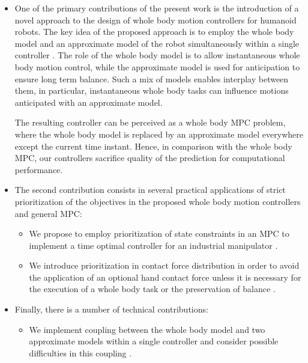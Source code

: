 \begin{itemize}
    \item One of the primary contributions of the present work is the
        introduction of a novel approach to the design of whole body motion
        controllers for humanoid robots. The key idea of the proposed approach
        is to employ the whole body model and an approximate model of the robot
        simultaneously within a single controller \cite{Sherikov2014humanoids,
        Sherikov2015humanoids}. The role of the whole body model is to allow
        instantaneous whole body motion control, while the approximate model is
        used for anticipation to ensure long term balance. Such a mix of models
        enables interplay between them, in particular, instantaneous whole body
        tasks can influence motions anticipated with an approximate model.

        The resulting controller can be perceived as a whole body \ac{MPC}
        problem, where the whole body model is replaced by an approximate model
        everywhere except the current time instant. Hence, in comparison with
        the whole body \ac{MPC}, our controllers sacrifice quality of the
        prediction for computational performance.


    \item The second contribution consists in several practical applications of
        strict prioritization of the objectives in the proposed whole body
        motion controllers and general \ac{MPC}:
        \begin{itemize}
            \item We propose to employ prioritization of state constraints in
                an \ac{MPC} to implement a time optimal controller for an
                industrial manipulator \cite{alHomsi2016icra}.

            \item We introduce prioritization in contact force distribution in
                order to avoid the application of an optional hand contact
                force unless it is necessary for the execution of a whole body
                task or the preservation of balance
                \cite{Sherikov2015humanoids}.
        \end{itemize}


    \item Finally, there is a number of technical contributions:
        \begin{itemize}
            \item We implement coupling between the whole body model and two
                approximate models within a single controller and consider
                possible difficulties in this coupling
                \cite{Sherikov2014humanoids, Sherikov2015humanoids}.


\end{itemize}
\end{itemize}

